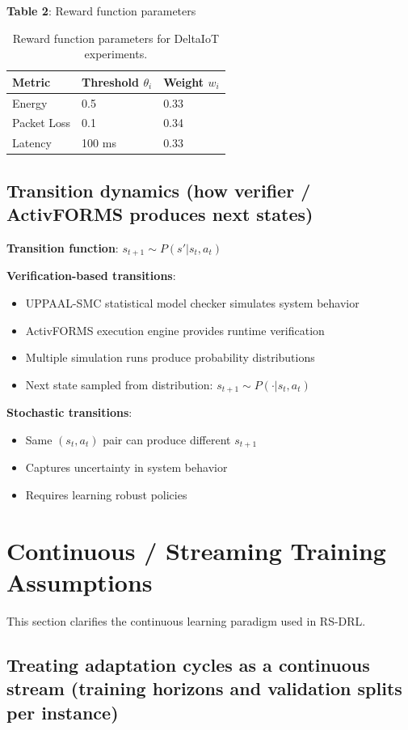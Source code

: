 \documentclass[11pt,a4paper]{article}
\begin{document}
\textbf{Table 2}: Reward function parameters
\begin{table}[H]
\centering
\begin{tabular}{lll}
\textbf{Metric} & \textbf{Threshold $\theta_i$} & \textbf{Weight $w_i$} \\
\hline
Energy & 0.5 & 0.33 \\
Packet Loss & 0.1 & 0.34 \\
Latency & 100 ms & 0.33 \\
\end{tabular}
\caption{Reward function parameters for DeltaIoT experiments.}
\end{table}

\subsection{Transition dynamics (how verifier / ActivFORMS produces next states)}

\textbf{Transition function}: $s_{t+1} \sim P(s'|s_t, a_t)$

\textbf{Verification-based transitions}:
\begin{itemize}
    \item UPPAAL-SMC statistical model checker simulates system behavior
    \item ActivFORMS execution engine provides runtime verification
    \item Multiple simulation runs produce probability distributions
    \item Next state sampled from distribution: $s_{t+1} \sim P(\cdot|s_t, a_t)$
\end{itemize}

\textbf{Stochastic transitions}:
\begin{itemize}
    \item Same $(s_t, a_t)$ pair can produce different $s_{t+1}$
    \item Captures uncertainty in system behavior
    \item Requires learning robust policies
\end{itemize}

\section{Continuous / Streaming Training Assumptions}

This section clarifies the continuous learning paradigm used in RS-DRL.

\subsection{Treating adaptation cycles as a continuous stream (training horizons and validation splits per instance)}
\end{document}
